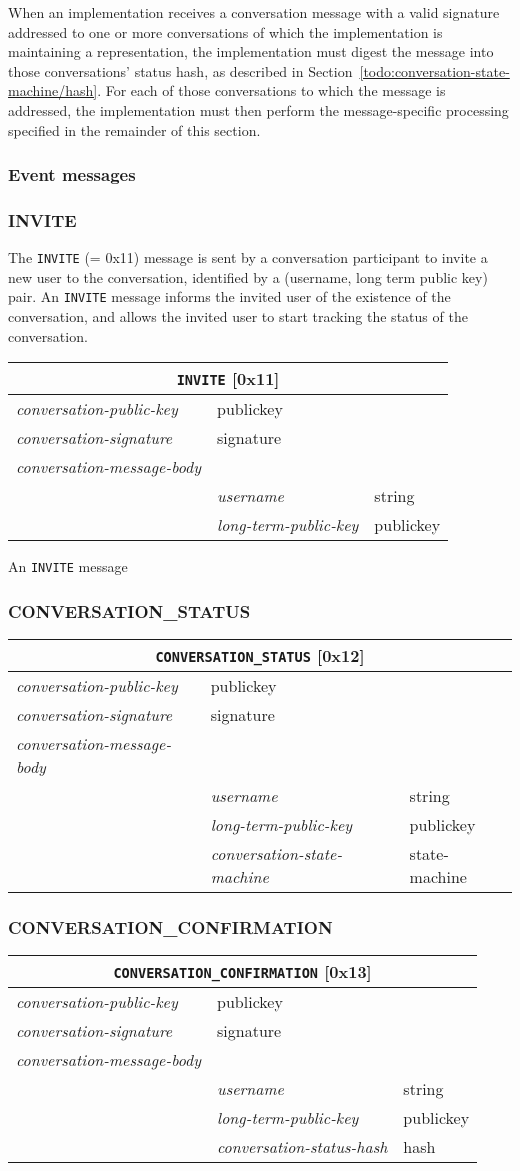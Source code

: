 \documentclass{article}
\def\message#1{\texttt{#1}}
\def\field#1{\textit{#1}}
\def\smfield#1{\textsf{#1}}
\newenvironment{conversationmessage}[2]{
\newcommand{\messagefield}[2]{
& \field{##1} & \textsf{##2} \\
\hline
}
\begin{tabular}{|l|l|l|}
\hline
\multicolumn{3}{|c|}{\message{#1} [#2]} \\
\hline
\hline
\field{conversation-public-key} & \multicolumn{2}{l|}{\textsf{publickey}} \\
\hline
\field{conversation-signature} & \multicolumn{2}{l|}{\textsf{signature}} \\
\hline
\field{conversation-message-body} & \multicolumn{2}{l|}{} \\
\hline
}{
\end{tabular}
}
\begin{document}
When an implementation receives a conversation message with a valid signature addressed to one or more conversations of which the implementation is maintaining a representation, the implementation must digest the message into those conversations' \smfield{status hash}, as described in Section~\ref{todo:conversation-state-machine/hash}.
For each of those conversations to which the message is addressed, the implementation must then perform the message-specific processing specified in the remainder of this section.

\subsubsection{Event messages}

\subsubsection{INVITE}

The \message{INVITE} (= 0x11) message is sent by a conversation participant to invite a new user to the conversation, identified by a (username, long term public key) pair.
An \message{INVITE} message informs the invited user of the existence of the conversation, and allows the invited user to start tracking the status of the conversation.

\begin{conversationmessage}{INVITE}{0x11}
\messagefield{username}{string}
\messagefield{long-term-public-key}{publickey}
\end{conversationmessage}

An \message{INVITE} message 


\subsubsection{CONVERSATION\_STATUS}

\begin{conversationmessage}{CONVERSATION\_STATUS}{0x12}
\messagefield{username}{string}
\messagefield{long-term-public-key}{publickey}
\messagefield{conversation-state-machine}{state-machine}
\end{conversationmessage}

\subsubsection{CONVERSATION\_CONFIRMATION}

\begin{conversationmessage}{CONVERSATION\_CONFIRMATION}{0x13}
\messagefield{username}{string}
\messagefield{long-term-public-key}{publickey}
\messagefield{conversation-status-hash}{hash}
\end{conversationmessage}
\end{document}
